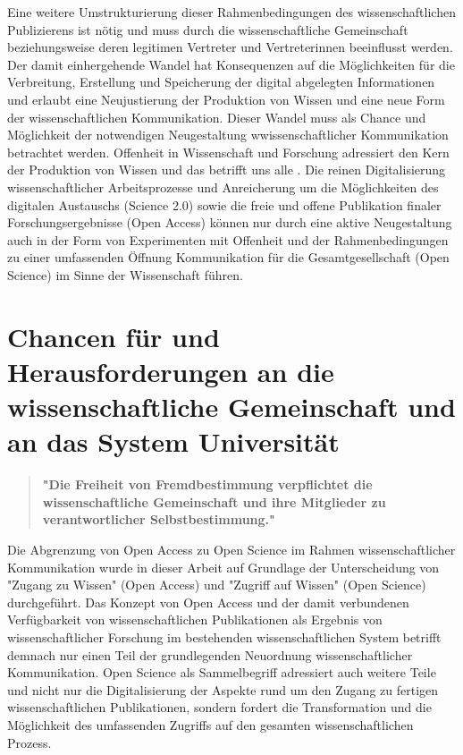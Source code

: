 Eine weitere Umstrukturierung dieser Rahmenbedingungen des wissenschaftlichen Publizierens ist nötig \cite{naeder_2010_open} und muss durch die wissenschaftliche Gemeinschaft beziehungsweise deren legitimen Vertreter und Vertreterinnen beeinflusst werden. Der damit einhergehende Wandel hat Konsequenzen auf die Möglichkeiten für die Verbreitung, Erstellung und Speicherung der digital abgelegten Informationen und erlaubt eine Neujustierung der Produktion von Wissen und eine neue Form der wissenschaftlichen Kommunikation. Dieser Wandel muss als Chance und Möglichkeit der notwendigen Neugestaltung wwissenschaftlicher Kommunikation betrachtet werden. Offenheit in Wissenschaft und Forschung adressiert den Kern der Produktion von Wissen und das betrifft uns alle \cite{Mussell_2013}. Die reinen Digitalisierung wissenschaftlicher Arbeitsprozesse und Anreicherung um die Möglichkeiten des digitalen Austauschs (Science 2.0) sowie die freie und offene Publikation finaler Forschungsergebnisse (Open Access) können nur durch eine aktive Neugestaltung auch in der Form von Experimenten mit Offenheit und der Rahmenbedingungen zu einer umfassenden Öffnung Kommunikation für die Gesamtgesellschaft (Open Science) im Sinne der Wissenschaft führen.

\section{Chancen für und Herausforderungen an die wissenschaftliche Gemeinschaft und an das System Universität}

\begin{quote}
\textbf{"Die Freiheit von Fremdbestimmung verpflichtet die wissenschaftliche Gemeinschaft und ihre Mitglieder zu verantwortlicher Selbstbestimmung."}
\end{quote} \cite{Oezmen_2015}

Die Abgrenzung von Open Access zu Open Science im Rahmen wissenschaftlicher Kommunikation wurde in dieser Arbeit auf Grundlage der Unterscheidung von "Zugang zu Wissen" (Open Access) und "Zugriff auf Wissen" (Open Science) durchgeführt. Das Konzept von Open Access und der damit verbundenen Verfügbarkeit von wissenschaftlichen Publikationen als Ergebnis von wissenschaftlicher Forschung im bestehenden wissenschaftlichen System betrifft demnach nur einen Teil der grundlegenden Neuordnung wissenschaftlicher Kommunikation. Open Science als Sammelbegriff adressiert auch weitere Teile und nicht nur die Digitalisierung der Aspekte rund um den Zugang zu fertigen wissenschaftlichen Publikationen, sondern fordert die Transformation und die Möglichkeit des umfassenden Zugriffs auf den gesamten wissenschaftlichen Prozess.

